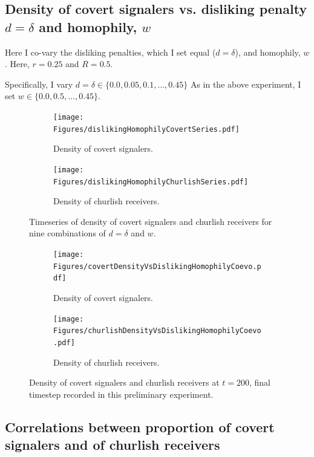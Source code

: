 \documentclass[11pt,letterpaper]{article}
\begin{document}
\subsection{Density of covert signalers vs. disliking penalty $d=\delta$ and homophily, $w$}

Here I co-vary the disliking penalties, which I set equal ($d=\delta$), and
homophily, $w$. Here, $r=0.25$ and $R=0.5$. 

Specifically, I vary $d=\delta \in \{0.0, 0.05, 0.1, \ldots, 0.45\}$
As in the above experiment, I set $w \in \{0.0, 0.5, \ldots, 0.45\}$.

\begin{figure}[H]

  \centering
  \begin{subfigure}{0.49\textwidth}
    \centering
    \texttt{[image: Figures/dislikingHomophilyCovertSeries.pdf]}
    \caption{Density of covert signalers.}
  \end{subfigure}
  \begin{subfigure}{0.49\textwidth}
    \centering
    \texttt{[image: Figures/dislikingHomophilyChurlishSeries.pdf]}
    \caption{Density of churlish receivers.}
  \end{subfigure}
  
  \caption{Timeseries of density of covert signalers and churlish receivers
    for nine combinations of $d=\delta$ and $w$.}
  \label{fig:dislikingHomophilySeries}
\end{figure}

\begin{figure}[H]
  \centering
  \begin{subfigure}{0.49\textwidth}
    \centering
    \texttt{[image: Figures/covertDensityVsDislikingHomophilyCoevo.pdf]}
    \caption{Density of covert signalers.}
  \end{subfigure}
  \begin{subfigure}{0.49\textwidth}
    \centering
    \texttt{[image: Figures/churlishDensityVsDislikingHomophilyCoevo.pdf]}
    \caption{Density of churlish receivers.}
  \end{subfigure}
  
  \caption{Density of covert signalers and churlish receivers at $t=200$, 
    final timestep recorded in this preliminary experiment.}
  \label{fig:dislikingHomophilyHeatmap}
\end{figure}


\subsection{Correlations between proportion of covert signalers and of churlish receivers}
\end{document}
